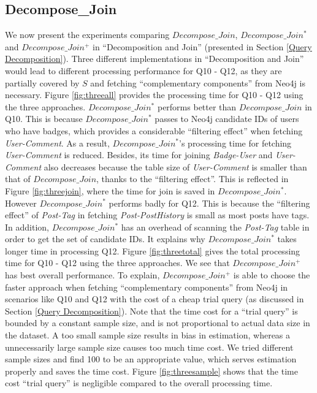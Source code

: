 \subsection{Decompose\_Join}
\label{exp:DecomposeJoin}
We now present the experiments comparing  $Decompose\_Join$, $Decompose\_Join^{*}$ and $Decompose\_Join^{+}$ in ``Decomposition and Join'' (presented in Section \ref{Query Decomposition}). Three different implementations in ``Decomposition and Join'' would lead to different processing performance for Q10 - Q12, as they are partially covered by $S$ and fetching ``complementary components'' from Neo4j is necessary. Figure \ref{fig:threeall} provides the processing time for Q10 - Q12 using the three approaches. $Decompose\_Join^{*}$ performs  better than $Decompose\_Join$ in Q10. This is because $Decompose\_Join^{*}$ passes to Neo4j candidate IDs of users who have badges, which provides a considerable ``filtering effect'' when fetching \textit{User-Comment}. As a result, $Decompose\_Join^{*}$'s processing time for fetching \textit{User-Comment} is reduced. Besides, its time for joining \textit{Badge-User} and \textit{User-Comment} also decreases because the table size of \textit{User-Comment} is smaller than that of $Decompose\_Join$, thanks to the ``filtering effect''. This is reflected in Figure \ref{fig:threejoin}, where the time for join is saved in $Decompose\_Join^{*}$. However $Decompose\_Join^{*}$ performs badly for Q12. This is because the ``filtering effect'' of \textit{Post-Tag} in fetching \textit{Post-PostHistory} is small as most posts have tags. In addition, $Decompose\_Join^{*}$ has an overhead of scanning the \textit{Post-Tag} table in order to get the set of candidate IDs. It explains why $Decompose\_Join^{*}$ takes longer time in processing Q12. Figure \ref{fig:threetotal} gives the total processing time for Q10 - Q12 using the three approaches. We see that $Decompose\_Join^{+}$ has best overall performance. To explain,  $Decompose\_Join^{+}$ is able to choose the faster approach when fetching ``complementary components'' from Neo4j in scenarios like Q10 and Q12 with  the cost of a cheap trial query (as discussed in Section \ref{Query Decomposition}). Note that the time cost for a ``trial query'' is bounded by a constant sample size, and is not proportional to actual data size in the dataset. A too small sample size results in bias in estimation, whereas a unnecessarily large sample size causes too much time cost. We tried different sample sizes and find  100 to be an appropriate value,  which serves estimation properly and saves the time cost. Figure \ref{fig:threesample} shows that the time cost ``trial query'' is negligible compared to the overall processing time.



